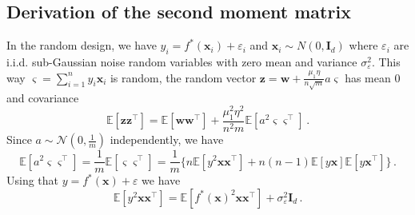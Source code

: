 \allowdisplaybreaks

\subsection{Derivation of the second moment matrix}\label{app:deriv-2nd-moment}

In the random design, we have $y_i = f^*(\bm x_i) +\varepsilon_i$ and $\bm x_i \sim N(0, \bm I_d)$ where $\varepsilon_i$ are i.i.d. sub-Gaussian noise random variables with zero mean and variance $\sigma_\varepsilon^2$. This way $\bm \varsigma = \sum_{i=1}^n y_i\bm x_i$ is random, the random vector $\bm z = \bm w + \frac{\mu_1\eta}{n\sqrt m}a\bm \varsigma$ has mean $0$ and covariance 
\[
    \mathbb E[\bm z \bm z^\top] = \mathbb E[\bm w \bm w^\top] + \frac{\mu_1^2 \eta^2}{n^2m}\mathbb E[a^2 \bm \varsigma \bm \varsigma^\top]\, .
\]
Since $a \sim \mathcal N(0, \frac{1}{m})$ independently, we have 
\[
    \mathbb E[a^2 \bm \varsigma \bm \varsigma^\top] = \frac{1}{m}\mathbb E[\bm \varsigma \bm \varsigma^\top] = \frac{1}{m}\Big\{ n\mathbb E[y^2 \bm x \bm x^\top] + n(n-1)\mathbb E[y\bm x] \mathbb E[y \bm x^\top] \Big\}\, .
\]
Using that $y = f^*(\bm x) + \varepsilon$ we have
\[
    \mathbb E[y^2 \bm x \bm x^\top] = \mathbb E[f^*(\bm x)^2 \bm x \bm x^\top] + \sigma_{\varepsilon}^2 \bm I_d\, .
\]

